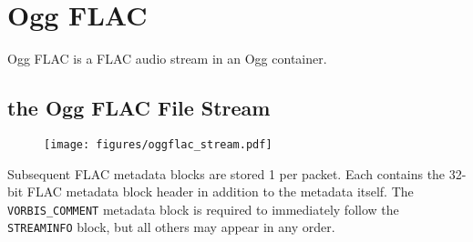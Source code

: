 
\chapter{Ogg FLAC}
Ogg FLAC is a FLAC audio stream in an Ogg container.

\section{the Ogg FLAC File Stream}
\begin{figure}[h]
\texttt{[image: figures/oggflac\_stream.pdf]}
\end{figure}
\par
\noindent
Subsequent FLAC metadata blocks are stored 1 per packet.
Each contains the 32-bit FLAC metadata block header
in addition to the metadata itself.
The \texttt{VORBIS\_COMMENT} metadata block is required to immediately
follow the \texttt{STREAMINFO} block, but all others may appear in
any order.
